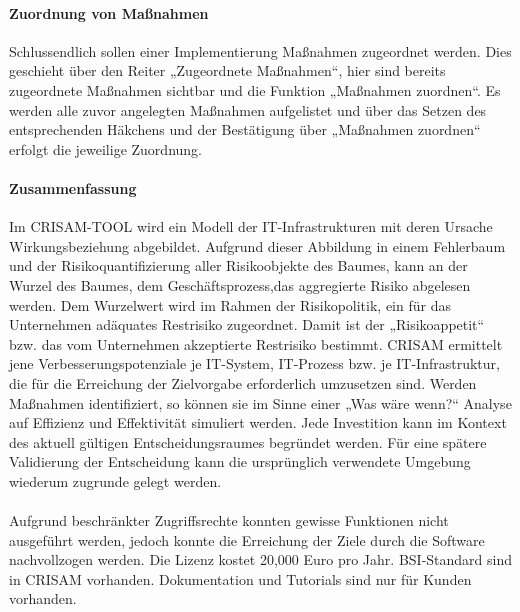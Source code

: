 \paragraph{Zuordnung von Maßnahmen}
Schlussendlich sollen einer Implementierung Maßnahmen zugeordnet werden. Dies geschieht über den Reiter „Zugeordnete Maßnahmen“, hier sind bereits zugeordnete Maßnahmen sichtbar und die Funktion „Maßnahmen zuordnen“. Es werden alle zuvor angelegten Maßnahmen aufgelistet und über das Setzen des entsprechenden Häkchens und der Bestätigung über „Maßnahmen zuordnen“ erfolgt die jeweilige Zuordnung.
\paragraph{Zusammenfassung}
Im CRISAM-TOOL wird ein Modell der IT-Infrastrukturen mit deren Ursache Wirkungsbeziehung abgebildet. Aufgrund dieser Abbildung in einem Fehlerbaum und der Risikoquantifizierung aller Risikoobjekte des Baumes, kann an der Wurzel des Baumes, dem Geschäftsprozess,das aggregierte Risiko abgelesen werden. Dem Wurzelwert wird im Rahmen der Risikopolitik, ein für das Unternehmen adäquates Restrisiko zugeordnet. Damit ist der „Risikoappetit“ bzw. das vom Unternehmen akzeptierte Restrisiko bestimmt.
CRISAM ermittelt jene Verbesserungspotenziale je IT-System, IT-Prozess bzw. je IT-Infrastruktur,
die für die Erreichung der Zielvorgabe erforderlich umzusetzen sind.
Werden Maßnahmen identifiziert, so können sie im Sinne einer „Was wäre wenn?“ Analyse auf Effizienz und Effektivität simuliert werden. Jede Investition kann im Kontext des aktuell gültigen Entscheidungsraumes begründet werden. Für eine spätere Validierung der Entscheidung kann die ursprünglich verwendete Umgebung wiederum zugrunde gelegt werden.
\\
\\
Aufgrund beschränkter Zugriffsrechte konnten gewisse Funktionen nicht ausgeführt werden, jedoch konnte die Erreichung der Ziele durch die Software nachvollzogen werden.
Die Lizenz kostet 20,000 Euro pro Jahr. BSI-Standard sind in CRISAM vorhanden. Dokumentation und Tutorials sind nur für Kunden vorhanden. 

